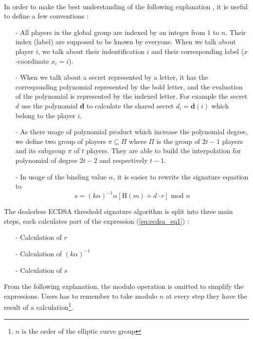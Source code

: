 \documentclass[a4paper,10pt]{article}
\begin{document}
\paragraph{} In order to make the best understanding of the following explanation , it is useful to define a few conventions :
\begin{itemize}
	\item[-] All players in the global group are indexed by an integer from $1$ to $n$. Their index (label) are supposed to be known by everyone. When we talk about player $i$, we talk about their indentification $i$ and their corresponding label ($x$-coordinate $x_i=i$).
	\item[-] When we talk about a secret represented by a letter, it has the corresponding polynomial represented by the bold letter, and the evaluation of the polynomial is represented by the indexed letter. For example the secret $d$ use the polynomial \textbf{d} to calculate the shared secret $d_i=\textbf{d}(i)$ which belong to the player $i$.
    \item[-] As there usage of polynomial product which increase the polynomial degree, we define two group of players $\pi\subseteq\Pi$ where $\Pi$ is the group of $2t-1$ players and its subgroup $\pi$ of $t$ players. They are able to build the interpolation for polynomial of degree $2t-2$ and respectively $t-1$.
    \item[-] In usage of the binding value $\alpha$, it is easier to rewrite the signature equation to 
    \begin{equation}
    \label{eq:ecdsa_eq1}
    s=(k\alpha)^{-1} \alpha [ \text{H}(m) + d \cdot r ] \text{ mod } n
    \end{equation}
\end{itemize}
The dealerless ECDSA threshold signature algorithm is split into three main steps, each calculates part of the expression (\ref{eq:ecdsa_eq1}) :
\begin{itemize}
	\item[-] Calculation of $r$
	\item[-] Calculation of $(k\alpha)^{-1}$
	\item[-] Calculation of $s$
\end{itemize}
From the following explanation, the modulo operation is omitted to simplify the expressions. Users has to remember to take modulo $n$ at every step they have the result of a calculation\footnote{$n$ is the order of the elliptic curve group}.
\end{document}
